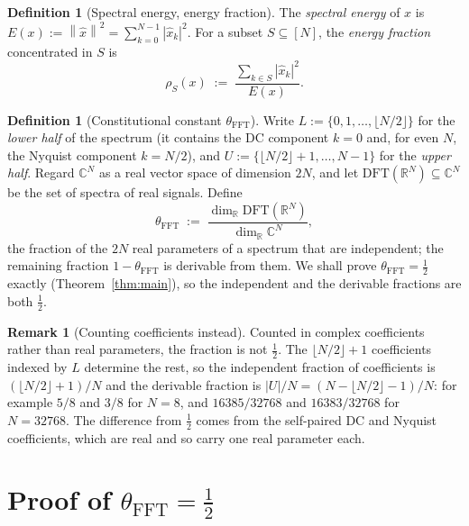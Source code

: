 \documentclass[12pt]{article}
\theoremstyle{definition}
\newtheorem{definition}[theorem]{Definition}
\newtheorem{remark}[theorem]{Remark}
\newcommand{\R}{\mathbb{R}}
\newcommand{\C}{\mathbb{C}}
\newcommand{\norm}[1]{\left\|#1\right\|}
\newcommand{\abs}[1]{\left|#1\right|}
\newcommand{\thetaFFT}{\theta_{\mathrm{FFT}}}
\newcommand{\DFT}{\mathrm{DFT}}
\begin{document}
\begin{definition}[Spectral energy, energy fraction]\label{def:energy}
The \emph{spectral energy} of $x$ is $E(x) := \norm{\hat{x}}^2 = \sum_{k=0}^{N-1} \abs{\hat{x}_k}^2$.
For a subset $S \subseteq [N]$, the \emph{energy fraction} concentrated
in $S$ is
\[
  \rho_S(x) \;:=\; \frac{\sum_{k \in S} \abs{\hat{x}_k}^2}{E(x)}.
\]
\end{definition}

\begin{definition}[Constitutional constant $\thetaFFT$]\label{def:theta}
Write $L := \{0, 1, \ldots, \lfloor N/2 \rfloor\}$ for the
\emph{lower half} of the spectrum (it contains the DC component $k=0$
and, for even $N$, the Nyquist component $k = N/2$), and
$U := \{\lfloor N/2 \rfloor + 1, \ldots, N-1\}$ for the
\emph{upper half}.  Regard $\C^N$ as a real vector space of dimension
$2N$, and let $\DFT(\R^N) \subseteq \C^N$ be the set of spectra of real
signals.  Define
\[
  \thetaFFT \;:=\; \frac{\dim_{\R} \DFT(\R^N)}{\dim_{\R} \C^N},
\]
the fraction of the $2N$ real parameters of a spectrum that are
independent; the remaining fraction $1 - \thetaFFT$ is derivable from
them.  We shall prove $\thetaFFT = \tfrac{1}{2}$ exactly
(Theorem~\ref{thm:main}), so the independent and the derivable
fractions are both $\tfrac{1}{2}$.
\end{definition}

\begin{remark}[Counting coefficients instead]\label{rem:coeffcount}
Counted in complex coefficients rather than real parameters, the
fraction is not $\tfrac{1}{2}$.  The $\lfloor N/2 \rfloor + 1$
coefficients indexed by $L$ determine the rest, so the independent
fraction of coefficients is $(\lfloor N/2 \rfloor + 1)/N$ and the
derivable fraction is $\abs{U}/N = (N - \lfloor N/2 \rfloor - 1)/N$:
for example $5/8$ and $3/8$ for $N = 8$, and $16385/32768$ and
$16383/32768$ for $N = 32768$.  The difference from $\tfrac{1}{2}$ comes
from the self-paired DC and Nyquist coefficients, which are real and so
carry one real parameter each.
\end{remark}

\section{Proof of $\thetaFFT = \tfrac{1}{2}$}
\label{sec:proof}
\end{document}
